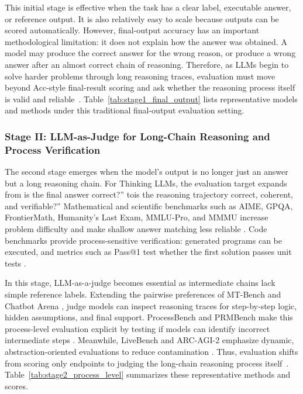 This initial stage is effective when the task has a clear label, executable answer, or reference output. It is also relatively easy to scale because outputs can be scored automatically. However, final-output accuracy has an important methodological limitation: it does not explain how the answer was obtained. A model may produce the correct answer for the wrong reason, or produce a wrong answer after an almost correct chain of reasoning. Therefore, as LLMs begin to solve harder problems through long reasoning traces, evaluation must move beyond Acc-style final-result scoring and ask whether the reasoning process itself is valid and reliable~\citep{gosmar2025prompt,vincent2025securing,yadav2025adversial,anand2026securing,li2025security}. Table~\ref{tab:stage1_final_output} lists representative models and methods under this traditional final-output evaluation setting.





\subsubsection{Stage II: LLM-as-Judge for Long-Chain Reasoning and Process Verification}

The second stage emerges when the model's output is no longer just an answer but a long reasoning chain. For Thinking LLMs, the evaluation target expands from is the final answer correct?'' tois the reasoning trajectory correct, coherent, and verifiable?'' Mathematical and scientific benchmarks such as AIME, GPQA, FrontierMath, Humanity's Last Exam, MMLU-Pro, and MMMU increase problem difficulty and make shallow answer matching less reliable \citep{rein2023gpqa,glazer2024frontiermath,phan2025hle,wang2024mmlupro,yue2023mmmu}. Code benchmarks provide process-sensitive verification: generated programs can be executed, and metrics such as Pass@1 test whether the first solution passes unit tests \citep{chen2021evaluating,jain2024livecodebench,evtimov2026wasp,geng2026prompt,chintala2025trustworthy,faccia2025prompting,wang2025comprehensive}.

In this stage, LLM-as-a-judge becomes essential as intermediate chains lack simple reference labels. Extending the pairwise preferences of MT-Bench and Chatbot Arena \citep{zheng2023judging}, judge models can inspect reasoning traces for step-by-step logic, hidden assumptions, and final support. ProcessBench and PRMBench make this process-level evaluation explicit by testing if models can identify incorrect intermediate steps \citep{zheng2024processbench,song2025prmbench}. Meanwhile, LiveBench and ARC-AGI-2 emphasize dynamic, abstraction-oriented evaluations to reduce contamination \citep{white2024livebench,chollet2025arcagi2}. Thus, evaluation shifts from scoring only endpoints to judging the long-chain reasoning process itself~\citep{wilson2024developer,del2025architecting,wang2026safeclaw,shah2026building,wang2026reframing,dong2024clr}. Table~\ref{tab:stage2_process_level} summarizes these representative methods and scores.


